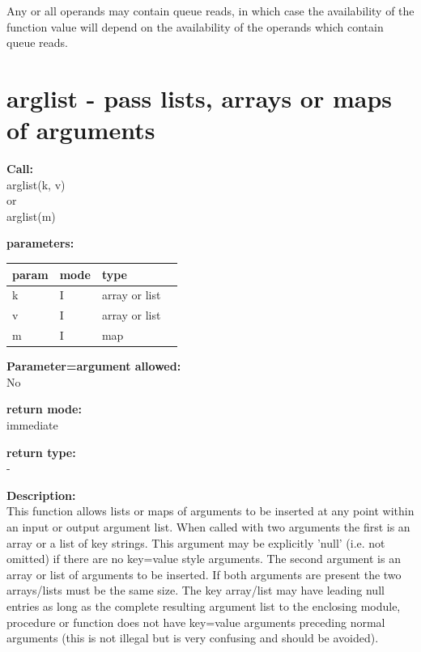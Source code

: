        Any or all operands may contain queue reads, in which case the availability
        of the function value will depend on the availability of the operands
        which contain queue reads.


    \section{arglist - pass lists, arrays or maps of arguments}\label{sec:ifarglist}
        
        
        {\bf Call:} \\
        arglist(k, v) \\
        or \\
        arglist(m)
        
        {\bf parameters:} \\
        \begin{tabular}{| l | l | l | l |}
        \hline
        param  & mode & type & \\
        \hline \hline
        k & I & array or list & \\ \hline
        v & I & array or list & \\ \hline
        m & I & map           & \\ \hline
        \end{tabular}
        
        {\bf Parameter=argument allowed:} \\
        No
        
        {\bf return mode:} \\
        immediate

        {\bf return type:} \\
        -
        
        {\bf Description:} \\
        This function allows lists or maps of arguments to be inserted at any point within an
        input or output argument list. When called with two arguments the first is an array or
        a list of key strings. This argument may be explicitly 'null' (i.e. not omitted) if
        there are no key=value style arguments. The second argument is an array or list of
        arguments to be inserted. If both arguments are present the two arrays/lists must be
        the same size. The key array/list may have leading null entries as long as the
        complete resulting argument list to the enclosing module, procedure or function does
        not have key=value arguments preceding normal arguments (this is not illegal but is
        very confusing and should be avoided).
        
